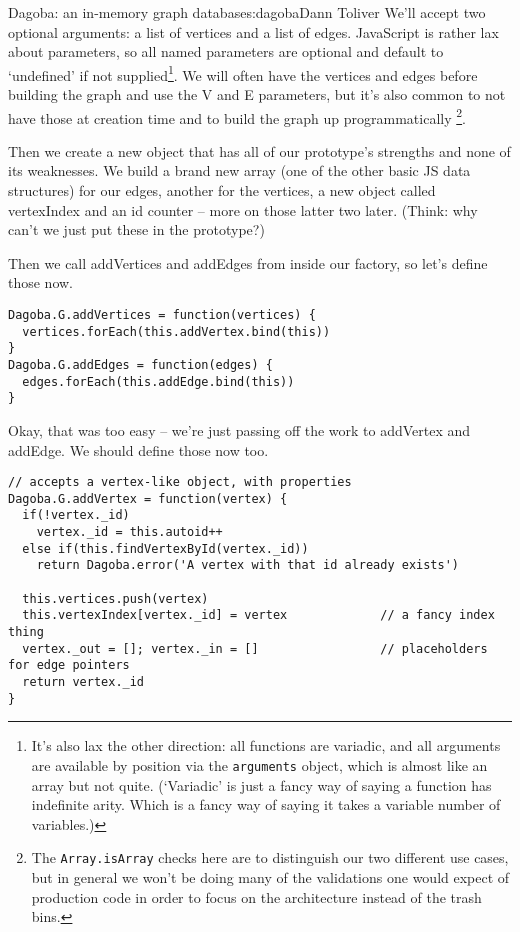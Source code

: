 \begin{aosachapter}{Dagoba: an in-memory graph database}{s:dagoba}{Dann Toliver}
We'll accept two optional arguments: a list of vertices and a list of
edges. JavaScript is rather lax about parameters, so all named
parameters are optional and default to `undefined' if not
supplied\footnote{It's also lax the other direction: all functions are
  variadic, and all arguments are available by position via the
  \texttt{arguments} object, which is almost like an array but not
  quite. (`Variadic' is just a fancy way of saying a function has
  indefinite arity. Which is a fancy way of saying it takes a variable
  number of variables.)}. We will often have the vertices and edges
before building the graph and use the V and E parameters, but it's also
common to not have those at creation time and to build the graph up
programmatically \footnote{The \texttt{Array.isArray} checks here are to
  distinguish our two different use cases, but in general we won't be
  doing many of the validations one would expect of production code in
  order to focus on the architecture instead of the trash bins.}.

Then we create a new object that has all of our prototype's strengths
and none of its weaknesses. We build a brand new array (one of the other
basic JS data structures) for our edges, another for the vertices, a new
object called vertexIndex and an id counter -- more on those latter two
later. (Think: why can't we just put these in the prototype?)

Then we call addVertices and addEdges from inside our factory, so let's
define those now.

\begin{verbatim}
Dagoba.G.addVertices = function(vertices) { 
  vertices.forEach(this.addVertex.bind(this)) 
}
Dagoba.G.addEdges = function(edges) { 
  edges.forEach(this.addEdge.bind(this)) 
}
\end{verbatim}

Okay, that was too easy -- we're just passing off the work to addVertex
and addEdge. We should define those now too.

\begin{verbatim}
// accepts a vertex-like object, with properties
Dagoba.G.addVertex = function(vertex) {                 
  if(!vertex._id)
    vertex._id = this.autoid++
  else if(this.findVertexById(vertex._id))
    return Dagoba.error('A vertex with that id already exists')
    
  this.vertices.push(vertex)
  this.vertexIndex[vertex._id] = vertex             // a fancy index thing
  vertex._out = []; vertex._in = []                 // placeholders for edge pointers
  return vertex._id
}
\end{verbatim}


\end{aosachapter}
